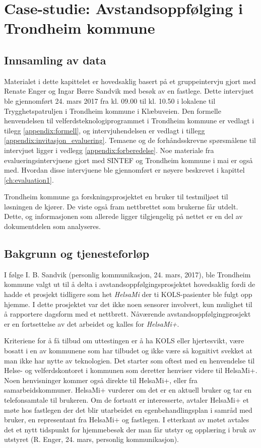 \chapter{Case-studie: Avstandsoppfølging i Trondheim kommune}
\label{ch:case}

\section{Innsamling av data}
Materialet i dette kapittelet er hovedsaklig basert på et gruppeintervju gjort med Renate Enger og Ingar Børre Sandvik med besøk
av en fastlege. Dette intervjuet ble gjennomført 24. mars 2017 fra kl. 09.00 til kl. 10.50 i lokalene til Trygghetspatruljen i
Trondheim kommune i Klæbuveien. Den formelle henvendelsen til velferdsteknologiprogrammet i Trondheim kommune er vedlagt i
tilegg \ref{appendix:formell}, og intervjuhendelsen er vedlagt i tillegg \ref{appendix:invitasjon_evaluering}. Temaene og
de forhåndsskrevne spørsmålene til intervjuet ligger i vedlegg \ref{appendix:forberedelse}.
Noe materiale fra evalueringsintervjuene gjort med SINTEF og Trondheim kommune i mai er
også med. Hvordan disse intervjuene ble gjennomført er nøyere beskrevet i kapittel \ref{ch:evaluation1}.

Trondheim kommune ga forskningsprosjektet en bruker til testmiljøet til løsningen de kjører. De viste også fram
nettbrettet som brukerne får utdelt. Dette, og informasjonen som allerede ligger tilgjengelig på nettet er en del
av dokumentdelen som analyseres.

\section{Bakgrunn og tjenesteforløp}
I følge I. B. Sandvik (personlig kommunikasjon, 24. mars, 2017), ble Trondheim kommune valgt ut til å delta i avstandsoppfølgingsprosjektet hovedsaklig fordi de hadde et
prosjekt tidligere som het \textit{HelsaMi} der ti KOLS-pasienter ble fulgt opp hjemme. I dette prosjektet var det ikke noen sensorer involvert,
kun mulighet til å rapportere dagsform med et nettbrett. Nåværende avstandsoppfølgingprosjekt er en fortsettelse av det arbeidet
og kalles for \textit{HelsaMi+}.

Kriteriene for å få tilbud om uttestingen er å ha KOLS eller hjertesvikt, være bosatt i en av kommunene som har tilbudet og ikke være så kognitivt
svekket at man ikke har nytte av teknologien. Det starter som oftest med en henvendelse til Helse- og velferdskontoret i kommunen som deretter
henviser videre til HelsaMi+. Noen henvisninger kommer også direkte til HelsaMi+, eller fra samarbeidskommuner. HelsaMi+ vurderer om det er en aktuell
bruker og tar en telefonsamtale til brukeren. Om de fortsatt er interesserte, avtaler HelsaMi+ et møte hos fastlegen der det blir utarbeidet en
egenbehandlingsplan i samråd med bruker, en representant fra HelsaMi+ og fastlegen. I etterkant av møtet avtales det et nytt tidspunkt for
hjemmebesøk der man får utstyr og opplæring i bruk av utstyret (R. Enger, 24. mars, personlig kommunikasjon).

